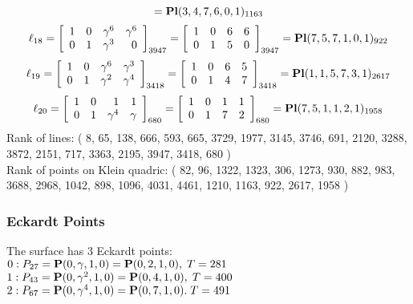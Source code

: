 \documentclass{article}
\newcommand{\bP}{{\bf P}}
\begin{document}
{$$={\rm\bf Pl}(3,4,7,6,0,1 )_{1163}$$
$$
\ell_{18} = 
\left[
\begin{array}{*{4}{r}}
1 & 0 & \gamma^{6} & \gamma^{6}\\
0 & 1 & \gamma^{3} & 0\\
\end{array}
\right]
_{3947}
=
\left[
\begin{array}{*{4}c}
1  & 0  & 6  & 6\\
0  & 1  & 5  & 0\\
\end{array}
\right]_{3947}
={\rm\bf Pl}(7,5,7,1,0,1 )_{922}$$
$$
\ell_{19} = 
\left[
\begin{array}{*{4}{r}}
1 & 0 & \gamma^{6} & \gamma^{3}\\
0 & 1 & \gamma^{2} & \gamma^{4}\\
\end{array}
\right]
_{3418}
=
\left[
\begin{array}{*{4}c}
1  & 0  & 6  & 5\\
0  & 1  & 4  & 7\\
\end{array}
\right]_{3418}
={\rm\bf Pl}(1,1,5,7,3,1 )_{2617}$$
$$
\ell_{20} = 
\left[
\begin{array}{*{4}{r}}
1 & 0 & 1 & 1\\
0 & 1 & \gamma^{4} & \gamma \\
\end{array}
\right]
_{680}
=
\left[
\begin{array}{*{4}c}
1  & 0  & 1  & 1\\
0  & 1  & 7  & 2\\
\end{array}
\right]_{680}
={\rm\bf Pl}(7,5,1,1,2,1 )_{1958}$$
Rank of lines: ( 8, 65, 138, 666, 593, 665, 3729, 1977, 3145, 3746, 691, 2120, 3288, 3872, 2151, 717, 3363, 2195, 3947, 3418, 680 )\\
Rank of points on Klein quadric: ( 82, 96, 1322, 1323, 306, 1273, 930, 882, 983, 3688, 2968, 1042, 898, 1096, 4031, 4461, 1210, 1163, 922, 2617, 1958 )\\
\subsubsection*{Eckardt Points}
The surface has 3 Eckardt points:\\
$0 : P_{27}=\bP(0, \gamma , 1, 0) = \bP(0, 2, 1, 0),\; T= 281$\\
$1 : P_{43}=\bP(0, \gamma^{2}, 1, 0) = \bP(0, 4, 1, 0),\; T= 400$\\
$2 : P_{67}=\bP(0, \gamma^{4}, 1, 0) = \bP(0, 7, 1, 0).\; T= 491$\\
}
\end{document}
